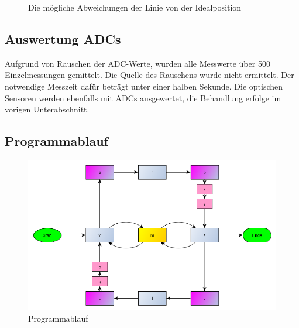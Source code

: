 \documentclass[a4paper,bibtotoc,oneside]{scrbook}
\begin{document}
\begin{figure}
\centering
\caption{Die mögliche Abweichungen der Linie von der Idealposition}
\end{figure} 


\subsection{Auswertung ADCs}\thispagestyle{empty}
Aufgrund von Rauschen der ADC-Werte, wurden alle Messwerte über 500 Einzelmessungen gemittelt. Die Quelle des Rauschens wurde nicht ermittelt. Der notwendige Messzeit dafür beträgt unter einer halben Sekunde. Die optischen Sensoren werden ebenfalls mit ADCs ausgewertet, die Behandlung erfolge im vorigen Unterabschnitt. 

\subsection{Programmablauf}\thispagestyle{empty}

\begin{figure}[htbp]
\centering
\includegraphics[width=150mm]{img/ablauf2.png}
\caption[Programmablauf]{Programmablauf}\label{abl}
\end{figure}
\end{document}
